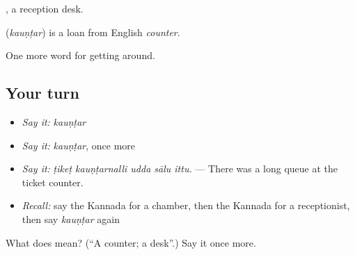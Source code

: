  , a reception desk.

\begin{cousinweb}
\textbf{} (\emph{kauṇṭar}) is a loan from English \emph{counter}.
\end{cousinweb}

\begin{grammarlens}[title={What you've built}]
One more word for getting around.
\end{grammarlens}

\subsection*{Your turn}
\begin{itemize}
\raggedright
  \item \emph{Say it:} \emph{kauṇṭar}
  \item \emph{Say it:} \emph{kauṇṭar}, once more
  \item \emph{Say it:} \emph{ṭikeṭ kauṇṭarnalli udda sālu ittu.} — There was a long queue at the ticket counter.
  \item \emph{Recall:} say the Kannada for a chamber, then the Kannada for a receptionist, then say \emph{kauṇṭar} again
\end{itemize}

\begin{tcolorbox}[breakable,colback=teal!4,colframe=teal!35!black,title={Before you move on}]
What does  mean? (\textquotedblleft{}A counter; a desk\textquotedblright{}.) Say it once more.
\end{tcolorbox}
